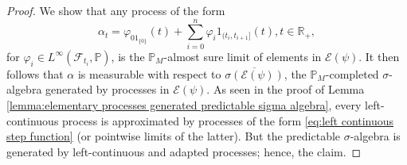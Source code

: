 \documentclass[11pt,a4paper,twoside,openany]{report}
\numberwithin{equation}{section}
\theoremstyle{plain} %
\theoremstyle{definition} %
\theoremstyle{remark} %
\begin{document}
\begin{proof}
    We show that any process of the form 
    \begin{equation}\label{eq:left continuous step function}
        \alpha_t = \varphi_01_{\{ 0\}}(t)+\sum_{i=0}^n \varphi_i1_{(t_i,t_{i+1}]}(t),t\in\mathbb{R}_+,
    \end{equation}
    for \(\varphi_i\in L^{\infty}(\mathcal{F}_{t_i},\mathbb{P})\), 
    is the \(\mathbb{P}_M\)-almost sure limit of elements in \(\mathcal{E}(\psi)\). It then follows that \(\alpha\) is measurable with respect to \(\overline{\sigma(\mathcal{E}(\psi))}\), the \(\mathbb{P}_M\)-completed \(\sigma\)-algebra generated by processes in \(\mathcal{E}(\psi)\). As seen in the proof of Lemma \ref{lemma:elementary processes generated predictable sigma algebra}, every left-continuous process is approximated by processes of the form \eqref{eq:left continuous step function} (or pointwise limits of the latter). But the predictable \(\sigma\)-algebra is generated by left-continuous and adapted processes; hence, the claim.




\end{proof}
\end{document}

